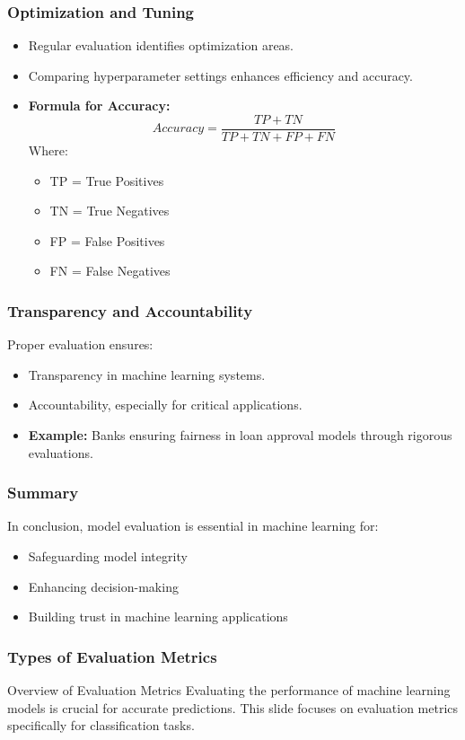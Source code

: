 \documentclass[aspectratio=169]{beamer}
\begin{document}
\begin{frame}[fragile]
  \frametitle{Optimization and Tuning}
  \begin{itemize}
    \item Regular evaluation identifies optimization areas.
    \item Comparing hyperparameter settings enhances efficiency and accuracy.
    \item \textbf{Formula for Accuracy:}
    \begin{equation}
      Accuracy = \frac{TP + TN}{TP + TN + FP + FN}
    \end{equation}
    Where:
    \begin{itemize}
      \item TP = True Positives
      \item TN = True Negatives
      \item FP = False Positives
      \item FN = False Negatives
    \end{itemize}
  \end{itemize}
\end{frame}

\begin{frame}[fragile]
  \frametitle{Transparency and Accountability}
  Proper evaluation ensures:
  \begin{itemize}
    \item Transparency in machine learning systems.
    \item Accountability, especially for critical applications.
    \item \textbf{Example:} Banks ensuring fairness in loan approval models through rigorous evaluations.
  \end{itemize}
\end{frame}

\begin{frame}[fragile]
  \frametitle{Summary}
  In conclusion, model evaluation is essential in machine learning for:
  \begin{itemize}
    \item Safeguarding model integrity
    \item Enhancing decision-making
    \item Building trust in machine learning applications
  \end{itemize}
\end{frame}

\begin{frame}[fragile]
    \frametitle{Types of Evaluation Metrics}
    \begin{block}{Overview of Evaluation Metrics}
        Evaluating the performance of machine learning models is crucial for accurate predictions.
        This slide focuses on evaluation metrics specifically for classification tasks.
    \end{block}
\end{frame}
\end{document}
